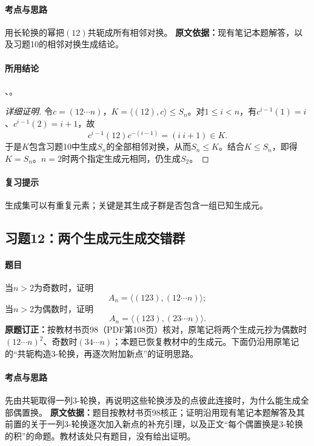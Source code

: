 \paragraph{考点与思路}用长轮换的幂把$(12)$共轭成所有相邻对换。
\textbf{原文依据：}现有笔记本题解答，以及习题10的相邻对换生成结论。
\paragraph{所用结论}、。
\begin{proof}[详细证明]
令$c=(12\cdots n)$，$K=\langle(12),c\rangle\le S_n$。对$1\le i<n$，有$c^{i-1}(1)=i$、$c^{i-1}(2)=i+1$，故
\[
c^{i-1}(12)c^{-(i-1)}=(i\ i+1)\in K.
\]
于是$K$包含习题10中生成$S_n$的全部相邻对换，从而$S_n\le K$。结合$K\le S_n$，即得$K=S_n$。$n=2$时两个指定生成元相同，仍生成$S_2$。
\end{proof}
\paragraph{复习提示}生成集可以有重复元素；关键是其生成子群是否包含一组已知生成元。

\subsection{习题12：两个生成元生成交错群}
\paragraph{题目}当$n>2$为奇数时，证明
\[
A_n=\langle(123),(12\cdots n)\rangle;
\]
当$n>2$为偶数时，证明
\[
A_n=\langle(123),(23\cdots n)\rangle.
\]
\textbf{原题订正：}按教材书页98（PDF第108页）核对，原笔记将两个生成元抄为偶数时$(12\cdots n)^2$、奇数时$(34\cdots n)$；本题已恢复教材中的生成元。下面仍沿用原笔记的“共轭构造3-轮换，再逐次附加新点”的证明思路。
\paragraph{考点与思路}先由共轭取得一列3-轮换，再说明这些轮换涉及的点彼此连接时，为什么能生成全部偶置换。
\textbf{原文依据：}题目按教材书页98核正；证明沿用现有笔记本题解答及其前置的关于一列3-轮换逐次加入新点的补充引理，以及正文“每个偶置换是3-轮换的积”的命题。教材该处只有题目，没有给出证明。
